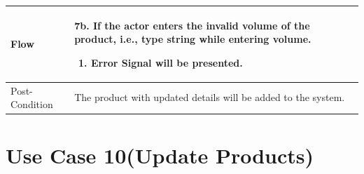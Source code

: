 \documentclass[12pt,a4paper]{report}
\begin{document}
\begin{tabular}{ | m{3cm} | m{12cm}| } \hline
Flow & 7b. If the actor enters the invalid volume of the product, i.e., type string while entering volume.
 	\begin{enumerate}
		\item Error Signal will be presented.
	\end{enumerate}
\\ \hline
Post-Condition &    The product with updated details will be added to the system.\\ \hline

\end{tabular}

\section{Use Case 10(Update Products) }
\end{document}
